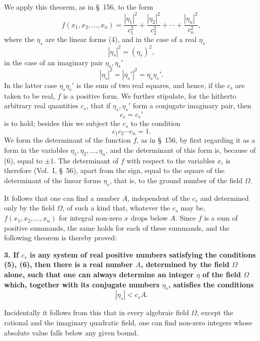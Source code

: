 \documentclass[11pt]{article}
\begin{document}
We apply this theorem, as in \S~156, to the form
\[
f(x_1,x_2,\ldots,x_n)=\frac{|\eta_1|^2}{c_1^2}+\frac{|\eta_2|^2}{c_2^2}+\cdots+\frac{|\eta_n|^2}{c_n^2},
\]
where the $\eta_s$ are the linear forms (4), and in the case of a real $\eta_s$
\[
|\eta_s|^2=(\eta_s)^2,
\]
in the case of an imaginary pair $\eta_s,\eta_s'$
\[
|\eta_s|^2=|\eta_s'|^2=\eta_s\eta_s'.
\]
In the latter case $\eta_s\eta_s'$ is the sum of two real squares, and hence, if the $c_s$ are taken to be real, $f$ is a positive form. We further stipulate, for the hitherto arbitrary real quantities $c_s$, that if $\eta_s,\eta_s'$ form a conjugate imaginary pair, then
\begin{equation}
c_s=c_s'
\tag{5}
\end{equation}
is to hold; besides this we subject the $c_s$ to the condition
\begin{equation}
c_1c_2\cdots c_n=1.
\tag{6}
\end{equation}
We form the determinant of the function $f$, as in \S~156, by first regarding it as a form in the variables $\eta_1,\eta_2,\ldots,\eta_n$, and the determinant of this form is, because of (6), equal to $\pm1$. The determinant of $f$ with respect to the variables $x_i$ is therefore (Vol.~I, \S~56), apart from the sign, equal to the
square of the determinant of the linear forms $\eta_s$, that is, to the ground number of the field $\Omega$.

It follows that one can find a number $A$, independent of the $c_s$ and determined only by the field $\Omega$, of such a kind that, whatever the $c_s$ may be, $f(x_1,x_2,\ldots,x_n)$ for integral non-zero $x$ drops below $A$. Since $f$ is a sum of positive summands, the same holds for each of these summands, and the following theorem is thereby proved:

\textbf{3. If $c_s$ is any system of real positive numbers satisfying the conditions (5), (6), then there is a real number $A$, determined by the field $\Omega$ alone, such that one can always determine an integer $\eta$ of the field $\Omega$ which, together with its conjugate numbers $\eta_s$, satisfies the conditions}
\begin{equation}
|\eta_s|<c_sA.
\tag{7}
\end{equation}

Incidentally it follows from this that in every algebraic field $\Omega$, except the rational and the imaginary quadratic field, one can find non-zero integers whose absolute value falls below any given bound.
\end{document}
